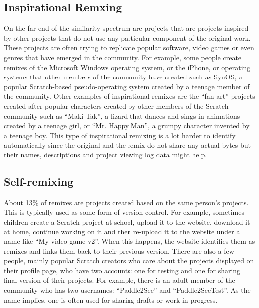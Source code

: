 \subsection{Inspirational Remxing}
On the far end of the similarity spectrum are projects that are projects inspired by other projects that do not use any particular component of the original work.
These projects are often trying to replicate popular software, video games or even genres that have emerged in the community.
For example, some people create remixes of the Microsoft Windows operating system, or the iPhone, or operating systems that other members of the community have created such as SynOS, a popular Scratch-based pseudo-operating system created by a teenage member of the community.
Other examples of inspirational remixes are the ``fan art'' projects created after popular characters created by other members of the Scratch community such as ``Maki-Tak'', a lizard that dances and sings in animations created by a teenage girl,  or  ``Mr. Happy Man'', a grumpy character invented by a teenage boy.
This type of inspirational remixing is a lot harder to identify automatically since the original and the remix do not share any actual bytes but their names, descriptions and project viewing log data might help. 

\subsection{Self-remixing}
About 13\% of remixes are projects created based on the same person's projects.
This is typically used as some form of version control.
For example, sometimes children create a Scratch project at school, upload it to the website, download it at home, continue working on it and then re-upload it to the website under a name like ``My video game v2''.
When this happens, the website identifies them as remixes and links them back to their previous version.
There are also a few people, mainly popular Scratch creators who care about the projects displayed on their profile page, who have two accounts: one for testing and one for sharing final version of their projects.
For example, there is an adult member of the community who has two usernames: ``Paddle2See'' and ``Paddle2SeeTest''.
As the name implies, one is often used for sharing drafts or work in progress.
 
